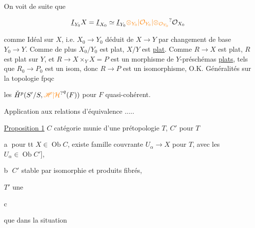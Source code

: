 On voit de suite que

\[
\underline I_{Y_0}X=\underline I_{X_0}\simeq\underline I_{Y_0}\unsure{\otimes_{Y_0}|\mathcal O_{Y_0}|\otimes_{\mathcal O_{Y_0}}}\mathcal O_{X_0}
\]

comme Idéal sur $X$, i.e. $X_0\longrightarrow Y_0$ déduit de $X\longrightarrow Y$ par changement de base $Y_0\longrightarrow Y$. Comme de plus $X_0/Y_0$ est plat, $X/Y$ est \uline{plat}. Comme $R\longrightarrow X$ est plat, $R$ est plat sur $Y$, et $R\longrightarrow X\times_Y X=P$ est un morphisme de $Y$-préschémas \uline{plats}, tels que $R_0\longrightarrow P_0$ est un isom, donc $R\longrightarrow P$ est un isomorphisme, O.K.
Généralités sur la topologie fpqc

les $\check H^p(S'/S,{\unsure{\mathscr H|\mathcal H}}^q(F))$ pour $F$ quasi-cohérent.

Application aux relations d'équivalence .....

\uline{Proposition 1} \quad $C$ catégorie  munie d'une prétopologie $T$,  $C'$    \uline{} pour $T$ 

\textcircled{a} pour tt $X\in\operatorname{Ob}C$, existe famille couvrante $U_\alpha\longrightarrow X$ pour $T$, avec les $U_\alpha\in\operatorname{Ob} C'$], 

\textcircled{b} $C'$ stable par isomorphie et produits fibrés, 

 $T'$ une   

\textcircled{c} 


que dans la situation


